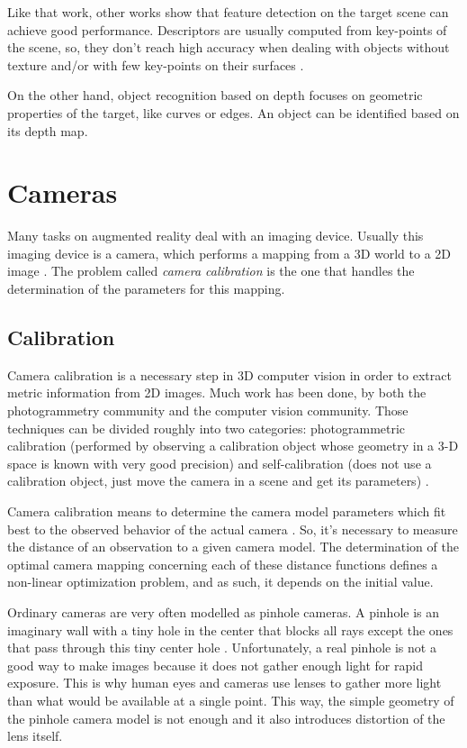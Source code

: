 \documentclass[msc, a4paper, classic, en]{ufbathesis}
\begin{document}
Like that work, other works show that feature detection on the target scene can achieve good performance. Descriptors are usually computed from key-points of the scene, so, they don't reach high accuracy when dealing with objects without texture and/or with few key-points on their surfaces \cite{bay}.

On the other hand, object recognition based on depth focuses on geometric properties of the target, like curves or edges. An object can be identified based on its depth map.


\section{Cameras}

Many tasks on augmented reality deal with an imaging device. Usually this imaging device is a camera, which performs a mapping from a 3D world to a 2D image \cite{hanning2011high}. The problem called \textit{camera calibration} is the one that handles the determination of the parameters for this mapping.

\subsection{Calibration}

Camera calibration is a necessary step in 3D computer vision in order to extract metric information from 2D images. Much work has been done, by both the photogrammetry community and the computer vision community. Those techniques can be divided roughly into two categories: photogrammetric calibration (performed by observing a calibration object whose geometry in a 3-D space is known with very good precision) and self-calibration (does not use a calibration object, just move the camera in a scene and get its parameters) \cite{zhang2000flexible}.

Camera calibration means to determine the camera model parameters which fit best to the observed behavior of the actual camera \cite{hanning2011high}. So, it's necessary to measure the distance of an observation to a given camera model. The determination of the optimal camera mapping concerning each of these distance functions defines a non-linear optimization problem, and as such, it depends on the initial value.

Ordinary cameras are very often modelled as pinhole cameras. A pinhole is an imaginary wall with a tiny hole in the center that blocks all rays except the ones that pass through this tiny center hole \cite{bradski2008learning}. Unfortunately, a real pinhole is not a good way to make images because it does not gather enough light for rapid exposure. This is why human eyes and cameras use lenses to gather more light than what would be available at a single point. This way, the simple geometry of the pinhole camera model is not enough and it also introduces distortion of the lens itself.
\end{document}

